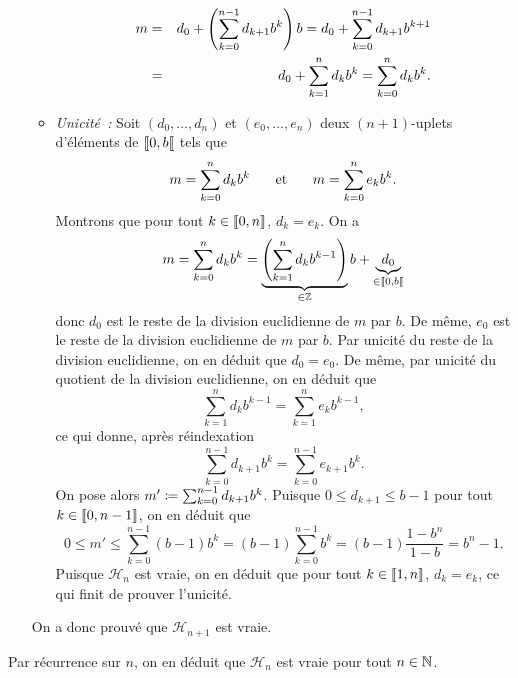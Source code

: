 \documentclass{magnolia}
\begin{document}
\begin{preuve}
\begin{itemize}
\begin{itemize}
\begin{eqnarray*}
m & = & d_0+\left(\sum_{k=0}^{n-1} d_{k+1} b^k\right)b = d_0+\sum_{k=0}^{n-1} d_{k+1} b^{k+1}\\
  & = & d_0+\sum_{k=1}^{n} d_{k} b^{k} = \sum_{k=0}^{n} d_{k} b^{k}.
\end{eqnarray*}
\item \emph{Unicité~:} Soit $(d_0,\ldots,d_n)$ et $(e_0,\ldots,e_n)$ deux $(n+1)$-uplets d'éléments de $\left\llbracket 0,b\right\llbracket$ tels que
\[m=\sum_{k=0}^n d_k b^k \quad\quad\!\text{et}\quad\!\quad m=\sum_{k=0}^n e_k b^k.\]
Montrons que pour tout $k\in\left\llbracket 0,n\right\rrbracket$, $d_k=e_k$. On a
\[m=\sum_{k=0}^{n} d_{k} b^{k} = \underbrace{\left(\sum_{k=1}^n d_k b^{k-1}\right)}_{\in\mathbb{Z}}b + \underbrace{d_0}_{\in\left\llbracket 0,b\right\llbracket}\]
donc $d_0$ est le reste de la division euclidienne de $m$ par $b$. De même, $e_0$ est le reste de la division euclidienne de $m$ par $b$. Par unicité du reste de la division euclidienne, on en déduit que $d_0=e_0$. De même, par unicité du quotient de la division euclidienne, on en déduit que
\[\sum_{k=1}^n d_k b^{k-1}=\sum_{k=1}^n e_k b^{k-1},\]
ce qui donne, après réindexation
\[\sum_{k=0}^{n-1} d_{k+1} b^k=\sum_{k=0}^{n-1} e_{k+1} b^k.\]
On pose alors $m'\coloneqq \sum_{k=0}^{n-1} d_{k+1} b^k$. Puisque $0\leq d_{k+1}\leq b-1$ pour tout $k\in\left\llbracket 0,n-1\right\rrbracket$, on en déduit que
\[0\leq m' \leq \sum_{k=0}^{n-1} (b-1)b^k=(b-1)\sum_{k=0}^{n-1} b^k=(b-1)\frac{1-b^n}{1-b}=b^n-1.\]
Puisque $\mathcal{H}_n$ est vraie, on en déduit que pour tout $k\in\left\llbracket 1,n\right\rrbracket$, $d_k=e_k$, ce qui finit de prouver l'unicité.
\end{itemize}
On a donc prouvé que $\mathcal{H}_{n+1}$ est vraie.
\end{itemize}
Par récurrence sur $n$, on en déduit que $\mathcal{H}_n$ est vraie pour tout $n\in\mathbb{N}$.
\end{preuve}
\end{document}
